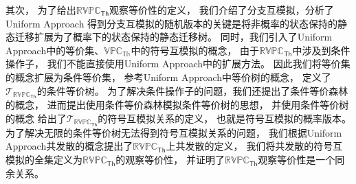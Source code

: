 其次，
为了给出$\mathbb{RVPC}_{\mathsf{Th}}$观察等价性的定义，
我们介绍了分支互模拟，分析了Uniform Approach
得到分支互模拟的随机版本的关键是将非概率的状态保持的静态迁移扩展为了概率下的状态保持的静态迁移树。
同时，我们引入了Uniform Approach中的等价集、$\mathbb{VPC}_{\mathbb{Th}}$中的符号互模拟的概念，
由于$\mathbb{RVPC}_{\mathsf{Th}}$中涉及到条件操作子，
我们不能直接使用Uniform Approach中的扩展方法。
因此我们将等价集的概念扩展为条件等价集，
参考Uniform Approach中等价树的概念，
定义了
$\mathcal{T}_{\mathbb{RVPC}_{\mathsf{Th}}}$的条件等价树。
为了解决条件操作子的问题，我们还提出了条件等价森林的概念，
进而提出使用条件等价森林模拟条件等价树的思想，
并使用条件等价树的概念
给出了$\mathcal{T}_{\mathbb{RVPC}_{\mathsf{Th}}}$的符号互模拟关系的定义，
也就是符号互模拟的概率版本。
为了解决无限的条件等价树无法得到符号互模拟关系的问题，
我们根据Uniform Approach共发散的概念提出了$\mathbb{RVPC}_{\mathsf{Th}}$上共发散的定义，
我们将共发散的符号互模拟的全集定义为$\mathbb{RVPC}_{\mathsf{Th}}$的观察等价性，
并证明了$\mathbb{RVPC}_{\mathsf{Th}}$观察等价性是一个同余关系。